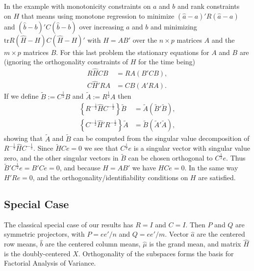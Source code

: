 \documentclass[
  12pt,
  letterpaper,
  DIV=11,
  numbers=noendperiod]{scrartcl}
\begin{document}
In the example with monotonicity constraints on \(a\) and \(b\) and rank
constraints\\
on \(H\) that means using monotone regression to minimize
\((\hat a-a)'R(\hat a-a)\) and \((\hat b-b)'C(\hat b-b)\) over
increasing \(a\) and \(b\) and minimizing
\(\text{tr} R(\hat H-H)C(\hat H-H)'\) with \(H=AB'\) over the
\(n\times p\) matrices \(A\) and the \(m\times p\) matrices \(B\). For
this last problem the stationary equations for \(A\) and \(B\) are
(ignoring the orthogonality constraints of \(H\) for the time being)
\begin{subequations}
\begin{align}
R\hat HCB&=RA(B'CB),\\
C\hat H'RA&=CB(A'RA).
\end{align}
\end{subequations} If we define \(\tilde B:=C^\frac12 B\) and
\(\tilde A:=R^\frac12 A\) then \begin{subequations}
\begin{align}
\left\{R^{-\frac12}\hat HC^{-\frac12}\right\}\tilde B&=\tilde A(\tilde B'\tilde B),\\
\left\{C^{-\frac12}\hat H'R^{-\frac12}\right\}\tilde A&=\tilde B(\tilde A'\tilde A),
\end{align}
\end{subequations} showing that \(\tilde A\) and \(\tilde B\) can be
computed from the singular value decomposition of
\(R^{-\frac12}\hat HC^{-\frac12}\). Since \(\tilde HCe=0\) we see that
\(C^\frac12e\) is a singular vector with singular value zero, and the
other singular vectors in \(\tilde B\) can be chosen orthogonal to
\(C^\frac12e\). Thus \(\tilde B'C^\frac12e=B'Ce=0\), and because
\(H=AB'\) we have \(HCe=0\). In the same way \(H'Re=0\), and the
orthogonality/identifiability conditions on \(H\) are satisfied.

\subsection{Special Case}\label{special-case}

The classical special case of our results has \(R=I\) and \(C=I\). Then
\(P\) and \(Q\) are symmetric projectors, with \(P=ee'/n\) and
\(Q=ee'/m\). Vector \(\hat a\) are the centered row means, \(\hat b\)
are the centered column means, \(\hat\mu\) is the grand mean, and matrix
\(\hat H\) is the doubly-centered \(X\). Orthogonality of the subspaces
forms the basis for Factorial Analysis of Variance.
\end{document}
